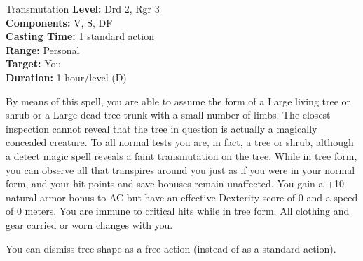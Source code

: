 {Transmutation}
{
	\textbf{Level:}
	Drd 2, Rgr 3\\
	\textbf{Components:}
	V, S, DF\\
	\textbf{Casting Time:}
	1 standard action\\
	\textbf{Range:}
	Personal\\
	\textbf{Target:}
	You\\
	\textbf{Duration:}
	1 hour/level (D)\\
}
{
	By means of this spell, you are able to assume the form of a Large living tree or shrub or a Large dead tree trunk with a small number of limbs. The closest inspection cannot reveal that the tree in question is actually a magically concealed creature. To all normal tests you are, in fact, a tree or shrub, although a detect magic spell reveals a faint transmutation on the tree. While in tree form, you can observe all that transpires around you just as if you were in your normal form, and your hit points and save bonuses remain unaffected. You gain a +10 natural armor bonus to AC but have an effective Dexterity score of 0 and a speed of 0 meters. You are immune to critical hits while in tree form. All clothing and gear carried or worn changes with you.

	You can dismiss tree shape as a free action (instead of as a standard action).

}

